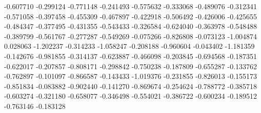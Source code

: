 -0.607710
-0.299124
-0.771148
-0.241493
-0.575632
-0.333068
-0.489076
-0.312341
-0.571058
-0.397458
-0.455309
-0.467897
-0.422918
-0.506492
-0.426006
-0.425655
-0.484347
-0.377495
-0.431355
-0.543433
-0.326584
-0.624040
-0.363978
-0.548488
-0.389799
-0.561767
-0.277287
-0.549269
-0.075266
-0.826808
-0.073123
-1.004874
0.028063
-1.202237
-0.314233
-1.058247
-0.208188
-0.960604
-0.043402
-1.181359
-0.142676
-0.981855
-0.314137
-0.623887
-0.466098
-0.203845
-0.694568
-0.187351
-0.622017
-0.207857
-0.808171
-0.298842
-0.750238
-0.187809
-0.655287
-0.133762
-0.762897
-0.101097
-0.866587
-0.143433
-1.019376
-0.231855
-0.826013
-0.155173
-0.851834
-0.083882
-0.902440
-0.141270
-0.869674
-0.254624
-0.788772
-0.385718
-0.603274
-0.321180
-0.658077
-0.346498
-0.554021
-0.386722
-0.600234
-0.189512
-0.763146
-0.183128
